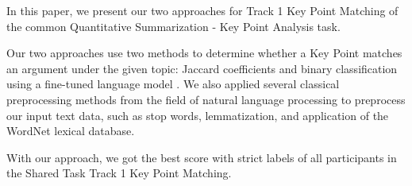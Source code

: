 In this paper, we present our two approaches for Track 1 Key Point Matching of the common Quantitative Summarization - Key Point Analysis task. 

Our two approaches use two methods to determine whether a Key Point matches an argument under the given topic: Jaccard coefficients and binary classification using a fine-tuned language model \Roberta. We also applied several classical preprocessing methods from the field of natural language processing to preprocess our input text data, such as stop words, lemmatization, and application of the WordNet lexical database.

With our approach, we got the best \mAP score with strict labels of all participants in the Shared Task Track 1 Key Point Matching.




